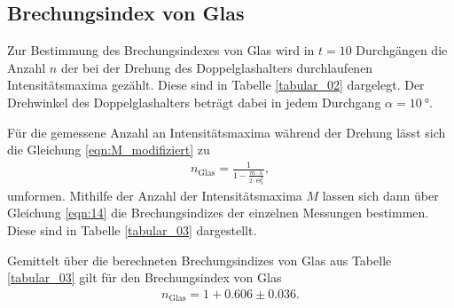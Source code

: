 \subsection{Brechungsindex von Glas}
\noindent Zur Bestimmung des Brechungsindexes von Glas wird in $t = 10$
Durchgängen die Anzahl $n$ der bei der Drehung des Doppelglashalters durchlaufenen
Intensitätsmaxima gezählt. Diese sind in Tabelle \ref{tabular_02} dargelegt.
Der Drehwinkel des Doppelglashalters beträgt dabei in jedem Durchgang $\alpha =
\SI{10}{\degree}$. \\
\FloatBarrier

\FloatBarrier
\noindent Für die gemessene Anzahl an Intensitätsmaxima während der Drehung
lässt sich die Gleichung \ref{eqn:M_modifiziert} zu
\begin{align}
  n_\text{Glas} = \frac{1}{1 - \frac{m \cdot \lambda}{2 \cdot \Theta_0^2}},
  \label{eqn:14}
\end{align}
\noindent umformen. Mithilfe der Anzahl der
Intensitätsmaxima $M$ lassen sich dann über Gleichung \ref{eqn:14} die
Brechungsindizes der einzelnen Messungen bestimmen. Diese sind in Tabelle
\ref{tabular_03} dargestellt. \\
\FloatBarrier

\FloatBarrier
\noindent Gemittelt über die berechneten Brechungsindizes von Glas aus Tabelle
\ref{tabular_03} gilt für den Brechungsindex von Glas
\begin{align}
  n_\text{Glas} = 1 +  0.606  \pm  0.036.
\end{align}
